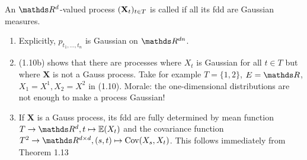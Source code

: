 \begin{defi}
	An $\Rd$-valued process $(\mathbf{X}_t)_{t \in T}$
	is called 
	if all its fdd are Gaussian measures.
\end{defi}


\begin{bem}
\begin{enumerate}[label=(\alph*)]
\item Explicitly, $p_{t_1,\dots , t_n}$ is Gaussian on $\R^{dn}$.
\item (1.10b) shows that there are processes where $X_t$ is Gaussian for all $t\in T$ but where $\textbf{X}$ is not a Gauss process. Take for example $T=\{1,2\}$, $E=\R$, $X_1=X^1,X_2=X^2$ in (1.10).
Morale: the one-dimensional distributions are not enough to make a process Gaussian!
\item If $\textbf{X}$ is a Gauss process, its fdd are fully determined by mean function $T \to \Rd, t \mapsto \E{X_t}$ and the covariance function $T^2\to \R^{d\times d}, (s,t) \mapsto \Cov(X_s,X_t)$.
This follows immediately from Theorem 1.13
\qedhere
\end{enumerate}
\end{bem}

